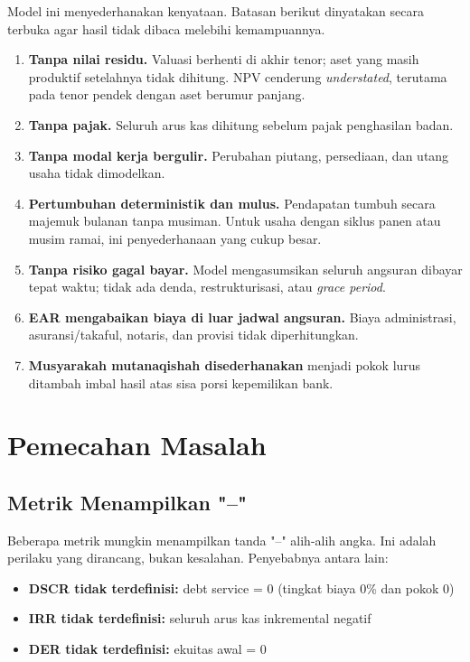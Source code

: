 \documentclass[12pt,a4paper,twoside]{report}
\begin{document}
Model ini menyederhanakan kenyataan. Batasan berikut dinyatakan secara terbuka agar hasil tidak dibaca melebihi kemampuannya.

\begin{enumerate}
  \item \textbf{Tanpa nilai residu.} Valuasi berhenti di akhir tenor; aset yang masih produktif setelahnya tidak dihitung. NPV cenderung \emph{understated}, terutama pada tenor pendek dengan aset berumur panjang.
  \item \textbf{Tanpa pajak.} Seluruh arus kas dihitung sebelum pajak penghasilan badan.
  \item \textbf{Tanpa modal kerja bergulir.} Perubahan piutang, persediaan, dan utang usaha tidak dimodelkan.
  \item \textbf{Pertumbuhan deterministik dan mulus.} Pendapatan tumbuh secara majemuk bulanan tanpa musiman. Untuk usaha dengan siklus panen atau musim ramai, ini penyederhanaan yang cukup besar.
  \item \textbf{Tanpa risiko gagal bayar.} Model mengasumsikan seluruh angsuran dibayar tepat waktu; tidak ada denda, restrukturisasi, atau \emph{grace period}.
  \item \textbf{EAR mengabaikan biaya di luar jadwal angsuran.} Biaya administrasi, asuransi/takaful, notaris, dan provisi tidak diperhitungkan.
  \item \textbf{Musyarakah mutanaqishah disederhanakan} menjadi pokok lurus ditambah imbal hasil atas sisa porsi kepemilikan bank.
\end{enumerate}

\chapter{Pemecahan Masalah}

\section{Metrik Menampilkan "--"}

Beberapa metrik mungkin menampilkan tanda "--" alih-alih angka. Ini adalah perilaku yang dirancang, bukan kesalahan. Penyebabnya antara lain:
\begin{itemize}
  \item \textbf{DSCR tidak terdefinisi:} debt service = 0 (tingkat biaya 0\% dan pokok 0)
  \item \textbf{IRR tidak terdefinisi:} seluruh arus kas inkremental negatif
  \item \textbf{DER tidak terdefinisi:} ekuitas awal = 0
\end{itemize}
\end{document}
